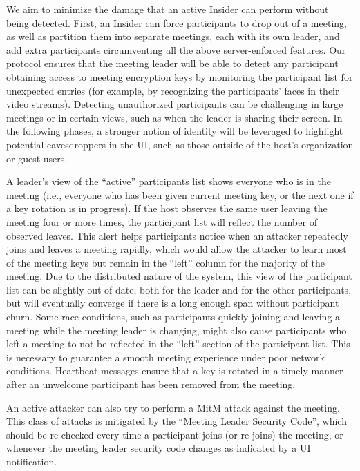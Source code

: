 We aim to minimize the damage that an active Insider can perform without being detected. First, an
Insider can force participants to drop out of a meeting, as well as partition them into separate
meetings, each with its own leader, and add extra participants circumventing all the above
server-enforced features. Our protocol ensures that the meeting leader will be able to detect any
participant obtaining access to meeting encryption keys by monitoring the participant list for
unexpected entries (for example, by recognizing the participants' faces in their video streams).
Detecting unauthorized participants can be challenging in large meetings or in certain views, such
as when the leader is sharing their screen. In the following phases, a stronger notion of identity
will be leveraged to highlight potential eavesdroppers in the UI, such as those outside of the
host's organization or guest users.

A leader's view of the ``active'' participants list shows everyone who is in the meeting
(i.e., everyone who has been given current meeting key, or the next one if a key rotation is in
progress). If the host observes the same user leaving the meeting four or more times, the participant
list will reflect the number of observed leaves. This alert helps participants notice when an attacker repeatedly joins and leaves a meeting rapidly, which would allow the attacker to learn most of the meeting keys but remain in the ``left'' column for the majority of the meeting. Due to the distributed nature of the
system, this view of the participant list can be slightly out of date, both for the leader and for
the other participants, but will eventually converge if there is a long enough span without
participant churn. Some race conditions, such as participants quickly joining and leaving a meeting
while the meeting leader is changing, might also cause participants who left a meeting to not be
reflected in the ``left'' section of the participant list. This is necessary to guarantee a smooth
meeting experience under poor network conditions. Heartbeat messages ensure that a key is rotated in
a timely manner after an unwelcome participant has been removed from the meeting.

An active attacker can also try to perform a MitM attack against the meeting. This class of attacks
is mitigated by the ``Meeting Leader Security Code'', which should be re-checked every time a
participant joins (or re-joins) the meeting, or whenever the meeting leader security code changes as
indicated by a UI notification. 

